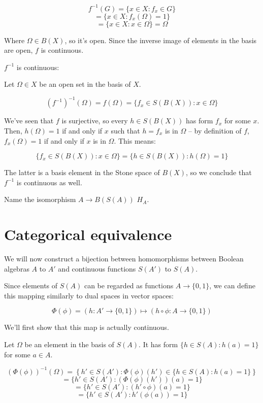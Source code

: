 \documentclass{article}
\begin{document}
      \[f^{-1}(G) = \{x \in X : f_x \in G\}\]
      \[ = \{x \in X : f_x(\Omega) = 1\}\]
      \[ = \{x \in X : x \in \Omega\} = \Omega\]

      Where $\Omega \in B(X)$, so it's open. Since the inverse image of elements
      in the basis are open, $f$ is continuous.

      $f^{-1}$ is continuous:

      Let $\Omega \in X$ be an open set in the basis of $X$.

      \[(f^{-1})^{-1}(\Omega) = f(\Omega) = \{f_x \in S(B(X)) : x \in \Omega\}\]

      We've seen that $f$ is surjective, so every $h \in S(B(X))$ has form $f_x$
      for some $x$. Then, $h(\Omega) = 1$ if and only if $x$ such that $h = f_x$
      is in $\Omega$ -- by definition of $f$, $f_x(\Omega) = 1$ if and only if
      $x$ is in $\Omega$. This means:

      \[\{f_x \in S(B(X)) : x \in \Omega\} = \{h \in S(B(X)) : h(\Omega) = 1\}\]

      The latter is a basis element in the Stone space of $B(X)$, so we conclude
      that $f^{-1}$ is continuous as well.

      Name the isomorphism $A \to B(S(A))$ $H_A$.

    \section{Categorical equivalence}

      We will now construct a bijection between homomorphisms between Boolean
      algebras $A$ to $A'$ and continuous functions $S(A')$ to $S(A)$.

      Since elements of $S(A)$ can be regarded as functions $A \rightarrow
      \{0,1\}$, we can define this mapping similarly to dual spaces in vector
      spaces:

      \[\Phi(\phi) = (h : A' \rightarrow \{0,1\}) \mapsto (h \circ \phi : A
      \rightarrow \{0,1\})\]

      We'll first show that this map is actually continuous.

      Let $\Omega$ be an element in the basis of $S(A)$. It has form $\{h \in
      S(A): h(a) = 1\}$ for some $a \in A$.

      \[(\Phi(\phi))^{-1}(\Omega) = \left\{h' \in S(A') : \Phi(\phi)(h') \in \{h
      \in S(A): h(a) = 1\} \right\}\]
      \[ = \{h' \in S(A') : (\Phi(\phi)(h'))(a) = 1 \}\]
      \[ = \{h' \in S(A') : (h' \circ \phi)(a) = 1 \}\]
      \[ = \{h' \in S(A') : h'(\phi(a)) = 1\}\]
\end{document}
